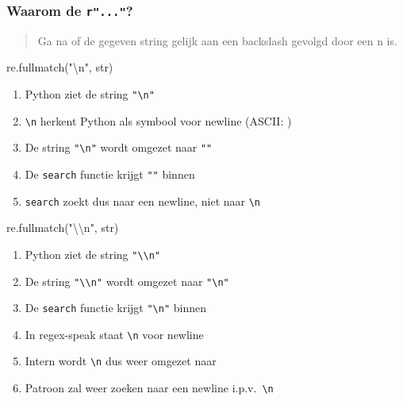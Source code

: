 \begin{frame}
  \frametitle{Waarom de \texttt{r"..."}?}
  \begin{quote}
    Ga na of de gegeven string gelijk aan een backslash gevolgd door een n is.
  \end{quote}
  \vskip5mm
  \begin{overprint}
    \begin{center} \ttfamily
      re.fullmatch("\textbackslash n", str)
    \end{center}
    \begin{enumerate}
      \item Python ziet de string \texttt{"\textbackslash n"}
      \item \texttt{\textbackslash n} herkent Python als symbool voor newline (ASCII: )
      \item De string \texttt{"\textbackslash n"} wordt omgezet naar \texttt{""}
      \item De \texttt{search} functie krijgt \texttt{""} binnen
      \item \texttt{search} zoekt dus naar een newline, niet naar \texttt{\textbackslash n}
    \end{enumerate}

    \begin{center} \ttfamily
      re.fullmatch("\textbackslash\textbackslash n", str)
    \end{center}
    \begin{enumerate}
      \item Python ziet de string \texttt{"\textbackslash\textbackslash n"}
      \item De string \texttt{"\textbackslash\textbackslash n"} wordt omgezet naar \texttt{"\textbackslash n"}
      \item De \texttt{search} functie krijgt \texttt{"\textbackslash n"} binnen
      \item In regex-speak staat \texttt{\textbackslash n} voor newline
      \item Intern wordt \texttt{\textbackslash n} dus weer omgezet naar 
      \item Patroon zal weer zoeken naar een newline i.p.v.~\texttt{\textbackslash n}
    \end{enumerate}


\end{overprint}
\end{frame}
